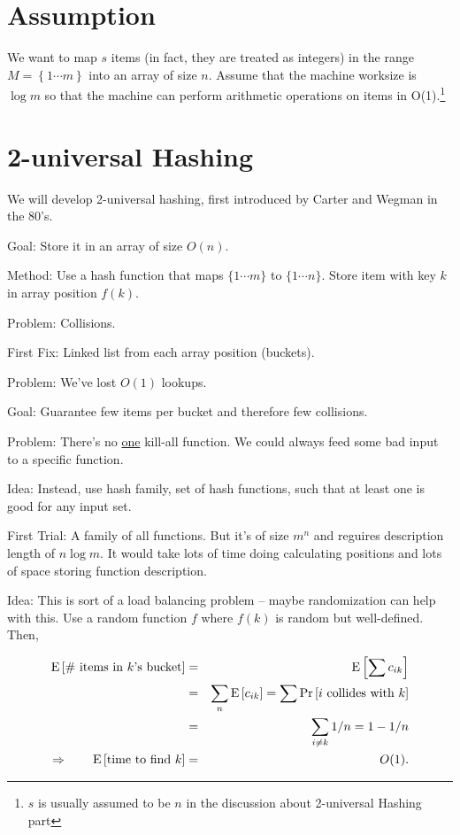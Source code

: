 \documentclass{article}
\renewcommand{\Pr}[1]{\textnormal{Pr}\left[ #1 \right]}
\newcommand{\E}[1]{\textnormal{E}\left[ #1 \right]}
\begin{document}
\section{Assumption}

We want to map $s$ items (in fact, they are treated as integers) in the range $M = \left\{ 1 \cdots m \right\}$ into an array of size $n$.
Assume that the machine worksize is $\log m$ so that the machine can perform arithmetic operations on items
in O(1).\footnote{$s$ is usually assumed to be $n$ in the discussion about 2-universal Hashing part}

\section{2-universal Hashing}

We will develop 2-universal hashing, first introduced by Carter and Wegman in the 80's.

Goal: Store it in an array of size $O(n)$.

Method: Use a hash function that maps $\{1 \cdots m\}$ to $\{1 \cdots n\}$.
Store item with key $k$ in array position $f(k)$.

Problem: Collisions.

First Fix: Linked list from each array position (buckets).

Problem: We've lost $O(1)$ lookups.

Goal: Guarantee few items per bucket and therefore few collisions.

Problem: There's no \underline{one} kill-all function. We could always feed some bad input to a specific function.

Idea: Instead, use hash family, set of hash functions, such that at least one is good for any input set.

First Trial: A family of all functions. But it's of size $m^n$ and reguires description length of $n \log m$.
It would take lots of time doing calculating positions and lots of space storing function description.

Idea: This is sort of a load balancing problem -- maybe randomization can help with this.
Use a random function $f$ where $f(k)$ is random but well-defined.  Then,

\begin{eqnarray*}
  \E{\hbox{\# items in $k$'s bucket}} & = & \E{\sum c_{ik}}
  \\
  & = & \sum_n \E{ c_{ik} } = \sum \Pr{i\hbox{ collides with } k} \\
  & = & \sum_{i \not= k} 1/n = 1 - 1/n \\
  \Rightarrow \qquad \E{\hbox{time to find } k}  & = & O(1).
\end{eqnarray*}
\end{document}
